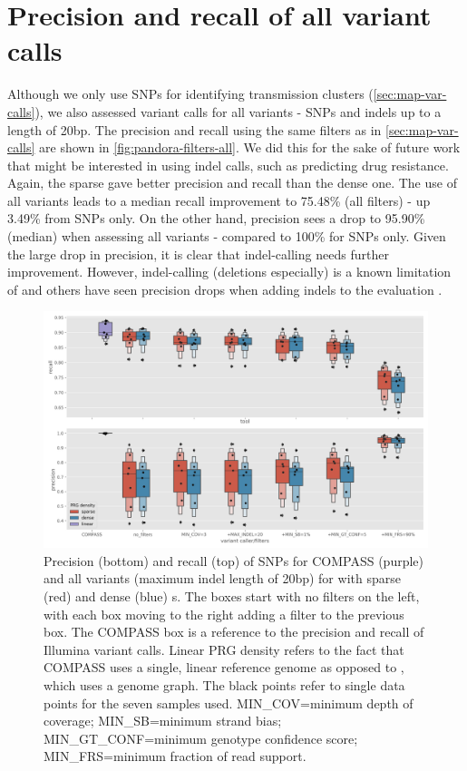 
\section{Precision and recall of all \pandora{} variant calls}
\label{app:pandora-all-vars}

Although we only use SNPs for identifying transmission clusters (\autoref{sec:map-var-calls}), we also assessed \pandora{} variant calls for all variants - SNPs and indels up to a length of 20bp. The precision and recall using the same filters as in \autoref{sec:map-var-calls} are shown in \autoref{fig:pandora-filters-all}. We did this for the sake of future work that might be interested in using \pandora{} indel calls, such as predicting drug resistance. Again, the sparse \prg{} gave better precision and recall than the dense one. The use of all variants leads to a median recall improvement to 75.48\% (all filters) - up 3.49\% from SNPs only. On the other hand, precision sees a drop to 95.90\% (median) when assessing all variants - compared to 100\% for SNPs only. Given the large drop in precision, it is clear that \pandora{} indel-calling needs further improvement. However, indel-calling (deletions especially) is a known limitation of \ont{} \cite{jain2018,wick2019} and others have seen precision drops when adding indels to the evaluation \cite{clair2020}.

\begin{figure}
\begin{center}
\includegraphics[width=0.90\columnwidth]{Appendix1/Figs/pandora-precision-recall-filters-all-variants.png}
\caption{{Precision (bottom) and recall (top) of SNPs for COMPASS (purple) and all variants (maximum indel length of 20bp) for \pandora{} with sparse (red) and dense (blue) \prg{}s. The \pandora{} boxes start with no filters on the left, with each box moving to the right adding a filter to the previous box. The COMPASS box is a reference to the precision and recall of Illumina variant calls. Linear PRG density refers to the fact that COMPASS uses a single, linear reference genome as opposed to \pandora{}, which uses a genome graph. The black points refer to single data points for the seven samples used. MIN\_COV=minimum depth of coverage; MIN\_SB=minimum strand bias; MIN\_GT\_CONF=minimum genotype confidence score; MIN\_FRS=minimum fraction of read support.
{\label{fig:pandora-filters-all}}%
}}
\end{center}
\end{figure}

